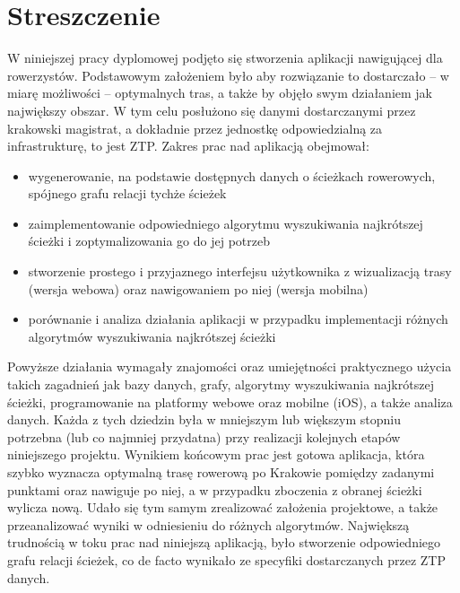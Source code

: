 \chapter{Streszczenie}
\label{cha:streszczenie}
W niniejszej pracy dyplomowej podjęto się stworzenia aplikacji nawigującej dla rowerzystów. Podstawowym założeniem było aby rozwiązanie to dostarczało – w miarę możliwości – optymalnych tras, a także by objęło swym działaniem jak największy obszar. W tym celu posłużono się danymi dostarczanymi przez krakowski magistrat, a dokładnie przez jednostkę odpowiedzialną za infrastrukturę, to jest ZTP. 
Zakres prac nad aplikacją obejmował:
\begin{itemize}
\item wygenerowanie, na podstawie dostępnych danych o ścieżkach rowerowych, spójnego grafu relacji tychże ścieżek
\item zaimplementowanie odpowiedniego algorytmu wyszukiwania najkrótszej ścieżki i zoptymalizowania go do jej potrzeb
\item stworzenie prostego i przyjaznego interfejsu użytkownika z wizualizacją trasy (wersja webowa) oraz nawigowaniem po niej (wersja mobilna)
\item porównanie i analiza działania aplikacji w przypadku implementacji różnych algorytmów wyszukiwania najkrótszej ścieżki
\end{itemize}
Powyższe działania wymagały znajomości oraz umiejętności praktycznego użycia takich zagadnień jak bazy danych, grafy, algorytmy wyszukiwania najkrótszej ścieżki, programowanie na platformy webowe oraz mobilne (iOS), a także analiza danych. Każda z tych dziedzin była w mniejszym lub większym stopniu potrzebna (lub co najmniej przydatna) przy realizacji kolejnych etapów niniejszego projektu.
Wynikiem końcowym prac jest gotowa aplikacja, która szybko wyznacza optymalną trasę rowerową po Krakowie pomiędzy zadanymi punktami oraz nawiguje po niej, a w przypadku zboczenia z obranej ścieżki wylicza nową. Udało się tym samym zrealizować założenia projektowe, a także przeanalizować wyniki w odniesieniu do różnych algorytmów.
Największą trudnością w toku prac nad niniejszą aplikacją, było stworzenie odpowiedniego grafu relacji ścieżek, co de facto wynikało ze specyfiki dostarczanych przez ZTP danych.